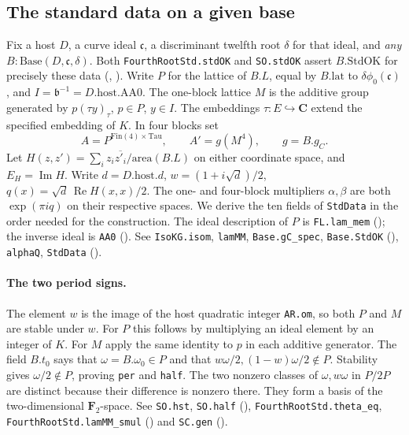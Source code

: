 \subsection{The standard data on a given base}
\label{r16:stdok}
Fix a host $D$, a curve ideal $\mathfrak c$, a discriminant twelfth root
$\delta$ for that ideal, and \emph{any} $B:\mathrm{Base}(D,\mathfrak c,\delta)$.
Both \nolinkurl{FourthRootStd.stdOK} and \nolinkurl{SO.stdOK} assert
$B.\mathrm{StdOK}$ for precisely these data
(,
). Write $P$ for the lattice
of $B.L$, equal by $B.\mathrm{lat}$ to $\delta\phi_0(\mathfrak c)$, and
$I=\mathfrak b^{-1}=D.\mathrm{host}.\mathrm{AA0}$. The one-block lattice
$M$ is the additive group generated by $p(\tau y)_\tau$, $p\in P$,
$y\in I$. The embeddings $\tau:E\hookrightarrow\mathbf C$ extend
the specified embedding of $K$. In four blocks set
\[
 A=P^{\mathrm{Fin}(4)\times\mathrm{Tau}},\qquad
 A'=g(M^4),\qquad g=B.g_C.
\]
Let $H(z,z')=\sum_i z_i\overline{z'_i}/\mathrm{area}(B.L)$ on either
coordinate space, and $E_H=\operatorname{Im} H$. Write $d=D.\mathrm{host}.d$,
$w=(1+i\sqrt d)/2$, $q(x)=\sqrt d\,\operatorname{Re}H(x,x)/2$.
The one- and four-block multipliers $\alpha,\beta$ are both
$\exp(\pi i q)$ on their respective spaces. We derive the ten fields
of \nolinkurl{StdData} in the order needed for the construction.
The ideal description of $P$ is \nolinkurl{FL.lam_mem}
(); the inverse ideal is
\nolinkurl{AA0} ().
See \nolinkurl{IsoKG.isom}, \nolinkurl{lamMM}, \nolinkurl{Base.gC_spec},
\nolinkurl{Base.StdOK} (),
\nolinkurl{alphaQ}, \nolinkurl{StdData}
().

\paragraph{The two period signs.}\label{r16:std-char}
The element $w$ is the image of the host quadratic integer
\nolinkurl{AR.om}, so both $P$ and $M$ are stable under $w$.
For $P$ this follows by multiplying an ideal element by an integer of
$K$. For $M$ apply the same identity to $p$ in each additive generator. The field
$B.t_0$ says that $\omega=B.\omega_0\in P$ and that
$w\omega/2,(1-w)\omega/2\notin P$. Stability gives
$\omega/2\notin P$, proving \nolinkurl{per} and \nolinkurl{half}.
The two nonzero classes of $\omega,w\omega$ in $P/2P$ are distinct
because their difference is nonzero there. They form a basis of the
two-dimensional $\mathbf F_2$-space. See \nolinkurl{SO.hst},
\nolinkurl{SO.half} (),
\nolinkurl{FourthRootStd.theta_eq}, \nolinkurl{FourthRootStd.lamMM_smul}
() and
\nolinkurl{SC.gen} ().

